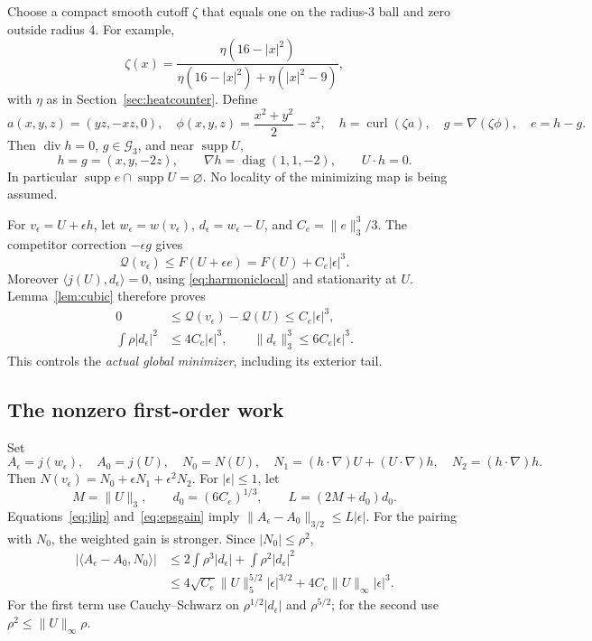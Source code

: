 \documentclass[11pt,a4paper]{article}
\theoremstyle{definition}
\theoremstyle{remark}
\newcommand{\G}{\mathcal G_3}
\newcommand{\Q}{\mathcal Q}
\newcommand{\norm}[1]{\lVert #1\rVert}
\newcommand{\ip}[2]{\langle #1,#2\rangle}
\newcommand{\diver}{\operatorname{div}}
\newcommand{\curl}{\operatorname{curl}}
\newcommand{\supp}{\operatorname{supp}}
\numberwithin{equation}{section}
\begin{document}
Choose a compact smooth cutoff \(\zeta\) that equals one on the radius-3 ball and zero outside radius 4. For example,
\[
\zeta(x)=\frac{\eta(16-|x|^2)}{\eta(16-|x|^2)+\eta(|x|^2-9)},
\]
with \(\eta\) as in Section~\ref{sec:heatcounter}. Define
\[
a(x,y,z)=(yz,-xz,0),\quad
\phi(x,y,z)=\frac{x^2+y^2}{2}-z^2,
\quad h=\curl(\zeta a),\quad g=\nabla(\zeta\phi),\quad e=h-g.
\]
Then \(\diver h=0\), \(g\in\G\), and near \(\supp U\),
\begin{equation}\label{eq:harmoniclocal}
h=g=(x,y,-2z),\qquad \nabla h=\operatorname{diag}(1,1,-2),
\qquad U\cdot h=0.
\end{equation}
In particular \(\supp e\cap\supp U=\varnothing\). No locality of the minimizing map is being assumed.

For \(v_\epsilon=U+\epsilon h\), let \(w_\epsilon=w(v_\epsilon)\), \(d_\epsilon=w_\epsilon-U\), and \(C_e=\norm e_3^3/3\). The competitor correction \(-\epsilon g\) gives
\[
\Q(v_\epsilon)\le F(U+\epsilon e)=F(U)+C_e|\epsilon|^3.
\]
Moreover \(\ip{j(U)}{d_\epsilon}=0\), using \eqref{eq:harmoniclocal} and stationarity at \(U\). Lemma~\ref{lem:cubic} therefore proves
\begin{equation}\label{eq:epsgain}
\begin{split}
0&\le\Q(v_\epsilon)-\Q(U)\le C_e|\epsilon|^3,\\
\int\rho|d_\epsilon|^2&\le4C_e|\epsilon|^3,
\qquad \norm{d_\epsilon}_3^3\le6C_e|\epsilon|^3.
\end{split}
\end{equation}
This controls the \emph{actual global minimizer}, including its exterior tail.

\subsection{The nonzero first-order work}
Set
\[
A_\epsilon=j(w_\epsilon),\quad A_0=j(U),\quad
N_0=N(U),\quad N_1=(h\cdot\nabla)U+(U\cdot\nabla)h,\quad N_2=(h\cdot\nabla)h.
\]
Then \(N(v_\epsilon)=N_0+\epsilon N_1+\epsilon^2N_2\). For \(|\epsilon|\le1\), let
\[
M=\norm U_3,\qquad d_0=(6C_e)^{1/3},\qquad L=(2M+d_0)d_0.
\]
Equations~\eqref{eq:jlip} and~\eqref{eq:epsgain} imply
\(\norm{A_\epsilon-A_0}_{3/2}\le L|\epsilon|\).
For the pairing with \(N_0\), the weighted gain is stronger. Since \(|N_0|\le\rho^2\),
\begin{align*}
|\ip{A_\epsilon-A_0}{N_0}|
&\le2\int\rho^3|d_\epsilon|+\int\rho^2|d_\epsilon|^2\\
&\le4\sqrt{C_e}\norm U_5^{5/2}|\epsilon|^{3/2}
+4C_e\norm U_\infty|\epsilon|^3.
\end{align*}
For the first term use Cauchy--Schwarz on \(\rho^{1/2}|d_\epsilon|\) and \(\rho^{5/2}\); for the second use \(\rho^2\le\norm U_\infty\rho\).
\end{document}
